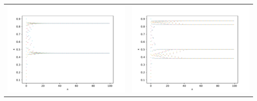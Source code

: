 \documentclass[a4paper,zihao=5,UTF8]{ctexart}
\begin{document}
    \begin{table}[htbp]
        \centering 
        \begin{tabular}[htbp]{cc}
            \includegraphics[scale=0.35]{5_2.pdf} & \includegraphics[scale=0.35]{5_4.pdf}\\

\end{tabular}
\end{table}
\end{document}
